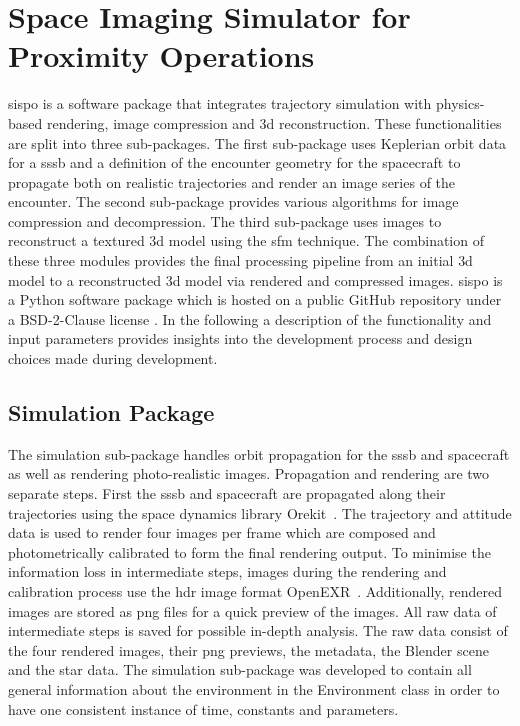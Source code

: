 \section{Space Imaging Simulator for Proximity Operations} \label{sec:sispo}
\gls{sispo} is a software package that integrates trajectory simulation with physics-based rendering, image compression and \gls{3d} reconstruction. These functionalities are split into three sub-packages. The first sub-package uses Keplerian orbit data for a \gls{sssb} and a definition of the encounter geometry for the spacecraft to propagate both on realistic trajectories and render an image series of the encounter. The second sub-package provides various algorithms for image compression and decompression. The third sub-package uses images to reconstruct a textured \gls{3d} model using the \gls{sfm} technique. The combination of these three modules provides the final processing pipeline from an initial \gls{3d} model to a reconstructed \gls{3d} model via rendered and compressed images. \Gls{sispo} is a Python software package which is hosted on a public GitHub repository under a BSD-2-Clause license \cite{Schwarzkopf2020SpaceOperations}. In the following a description of the functionality and input parameters provides insights into the development process and design choices made during development.

\subsection{Simulation Package}
The simulation sub-package handles orbit propagation for the \gls{sssb} and spacecraft as well as rendering photo-realistic images. Propagation and rendering are two separate steps. First the \gls{sssb} and spacecraft are propagated along their trajectories using the space dynamics library Orekit~\cite{orekit}. The  trajectory and attitude data is used to render four images per frame which are composed and photometrically calibrated to form the final rendering output. To minimise the information loss in intermediate steps, images during the rendering and calibration process use the \gls{hdr} image format OpenEXR~\cite{openexr}. Additionally, rendered images are stored as \gls{png} files for a quick preview of the images. All raw data of intermediate steps is saved for possible in-depth analysis. The raw data consist of the four rendered images, their \gls{png} previews, the metadata, the Blender scene and the star data. The simulation sub-package was developed to contain all general information about the environment in the Environment class in order to have one consistent instance of time, constants and parameters.

